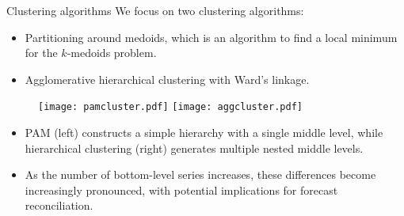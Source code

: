 \documentclass[aspectratio=169]{beamer}
\begin{document}
\begin{frame}{Clustering algorithms}
	We focus on two clustering algorithms:

	\begin{itemize}
		\item {\color{red} Partitioning around medoids}, which is an algorithm to find a local minimum for the $k$-medoids problem.
		\item {\color{red} Agglomerative hierarchical clustering} with Ward's linkage.
	\end{itemize}

	\begin{figure}
		\centering
		\texttt{[image: pamcluster.pdf]}
		\texttt{[image: aggcluster.pdf]}
	\end{figure}

	\begin{itemize}
		\item PAM (left) constructs {\color{red} a simple hierarchy with a single middle level}, while hierarchical clustering (right) generates {\color{red} multiple nested middle levels}.
		\item As the number of bottom-level series increases, these differences become increasingly pronounced, with potential implications for forecast reconciliation.
	\end{itemize}
\end{frame}
\end{document}
